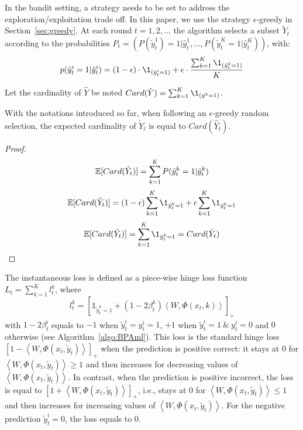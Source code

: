 In the bandit setting, a strategy needs to be set to address the exploration/exploitation trade off. In this paper, we use the strategy $\epsilon$-greedy in Section~\ref{sec:greedy}. At each round $t=1,2,\dots$ the algorithm selects a subset $\tilde{Y}_t$ according to the probabilities $P_t = \left(P(\tilde{y}_t^1) = 1| \hat{y}_t^1,\dots, P(\tilde{y}_t^K = 1|\hat{y}_t^K)\right)$, with:
\begin{equation}
\label{equa:epsilongreedyml}
p(\tilde{y}_t^i = 1|\hat{y}_t^i) = (1-\epsilon)\cdot \1_{(\hat{y}_t^i=1)}+ \epsilon\cdot\frac{\sum_{k=1}^{K}\1_{(\hat{y}_t^k = 1)}}{K}
\end{equation}

Let the cardinality of $\hat{Y}$ be noted $Card(\hat{Y}) = \sum_{k=1}^{K}\1_{(\hat{y}^k = 1)}$.
\begin{lema}
With the notations introduced so far, when following an $\epsilon$-greedy random selection, the expected cardinality of $\tilde{Y}_t$ is equal to $Card(\hat{Y}_t)$.
\end{lema}
\begin{proof}
\[\mathbb{E}[Card(\tilde{Y}_t)] = \sum_{k=1}^{K} P(\tilde{y}_t^k = 1| \hat{y}_t^k)\]
\[\E[Card(\hY)] = (1-\epsilon)\sumk \1_{\hy^k = 1}+\epsilon \sumk \1_{\hy^k = 1}\]
\[\E[Card(\tY)] = \sumk\1_{\hy^k = 1} = Card(\hY)\]
\end{proof}

The instantaneous loss is defined as a piece-wise hinge loss function $L_t = \sum_{k=1}^{K} l_t^k$, where
\begin{equation}
\label{eq:loss}
l_t^k = [\mathds{1}_{ \tilde{y}_t^k = 1} + \left(1-2\beta_t^k\right) \left\langle W, \Phi(x_t,k)\right\rangle]_{+}
\end{equation}
with $1-2\beta_t^i$ equals to $-1$ when $\tilde{y}_t^i=y_t^i=1$,  $+1$ when $\tilde{y}_t^i = 1\ \&\ y_t^i = 0$ and $0$ otherwise (see Algorithm~\ref{algo:BPAml}). This loss is the standard hinge loss $[1-\left\langle W,\Phi(x_t,\tilde{y}_t)\right\rangle]_{+}$ when the prediction is positive correct: it stays at $0$ for $\left\langle W,\Phi(x_t,\tilde{y}_t)\right\rangle \geqslant 1$ and then increases for decreasing values of $\left\langle W,\Phi(x_t,\tilde{y}_t)\right\rangle$. In contrast, when the prediction is positive incorrect, the loss is equal to $[1+\left\langle W,\Phi(x_t,\tilde{y}_t)\right\rangle]_{+}$, i.e., stays at $0$ for $\left\langle W,\Phi(x_t,\tilde{y}_t)\right\rangle \leq 1$ and then increases for increasing values of $\left\langle W,\Phi(x_t,\tilde{y}_t)\right\rangle$. For the negative prediction $\tilde{y}_t^i = 0$, the loss equals to $0$.

